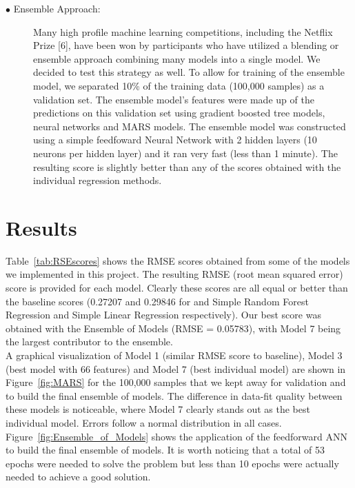 \documentclass{article}
\begin{document}
\begin{description}
\item[\hspace{0.75cm}$\bullet$ Ensemble Approach:] Many high profile machine learning competitions, including the Netflix Prize [6], have been won by participants who have utilized a blending or ensemble approach combining many models into a single model. We decided to test this strategy as well. To allow for training of the ensemble model, we separated 10\% of the training data (100,000 samples) as a validation set. The ensemble model's features were made up of the predictions on this validation set using gradient boosted tree models, neural networks and MARS models. The ensemble model was constructed using a simple feedfoward Neural Network with 2 hidden layers (10 neurons per hidden layer) and it ran very fast (less than 1 minute). The resulting score is slightly better than any of the  scores obtained with the individual regression methods.


\end{description}

 

\section{Results}

Table~\ref{tab:RSEscores}  shows the RMSE scores obtained from some of the models we implemented in this project. The resulting RMSE (root mean squared error) score is provided for each model. Clearly  these scores are all equal or better than the baseline scores (0.27207 and 0.29846 for and Simple Random Forest Regression and Simple Linear Regression respectively). Our best score was obtained with the Ensemble of Models (RMSE = 0.05783), with Model 7 being the largest contributor to the ensemble. \\

A graphical visualization of Model 1 (similar RMSE score to baseline), Model 3 (best model with 66 features) and Model 7 (best individual model) are shown in Figure~\ref{fig:MARS} for the 100,000 samples that we kept away for validation and to build the final ensemble of models. The difference in data-fit quality between these models is noticeable, where Model 7 clearly stands out as the best individual model. Errors follow a normal distribution in all cases. Figure~\ref{fig:Ensemble_of_Models} shows the application of the feedforward ANN to build the final ensemble of models. It is worth noticing that a total of 53 epochs were needed to solve the problem but less than 10 epochs were actually needed to achieve a good solution. 
\end{document}
